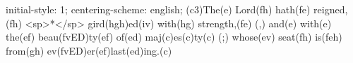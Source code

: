 initial-style: 1;
centering-scheme: english;
(c3)The(e) Lord(fh) hath(fe) reigned,(fh) <sp>*</sp> gird(hgh)ed(iv) with(hg) strength,(fe) (,) and(e) with(e) the(ef) beau(fvED)ty(ef) of(ed) maj(c)es(c)ty(c) (;) whose(ev) seat(fh) is(feh) from(gh) ev(fvED)er(ef)last(ed)ing.(c)

